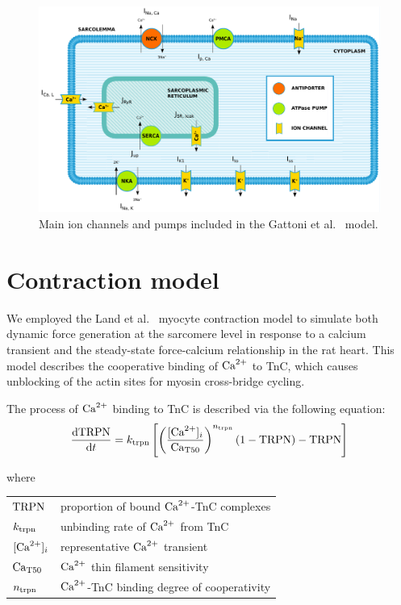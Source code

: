 \begin{figure}[ht!]
    \myfloatalign
    \includegraphics[width=\textwidth]{figures/chapter02/new_ep.pdf}
    \caption{Main ion channels and pumps included in the Gattoni et al.~\cite{Gattoni:2016} model.}
    \label{fig:gattonicurrentsfig}
\end{figure}


%
%
%
\section{Contraction model}\label{sec:ch2contractionmodel}
We employed the Land et al.~\cite{Land:2012} myocyte contraction model to simulate both dynamic force generation at the sarcomere level in response to a calcium transient and the steady-state force-calcium relationship in the rat heart. This model describes the cooperative binding of $\textrm{Ca}^{2+}$ to TnC, which causes unblocking of the actin sites for myosin cross-bridge cycling.

\vspace{0.2cm}
The process of $\textrm{Ca}^{2+}$ binding to TnC is described via the following equation:
%
\begin{equation}\label{eq:landodesys1}
    \dfrac{\mathrm{d}{\textrm{TRPN}}}{\mathrm{d}{t}} = k_{\textrm{trpn}}\left[\left(\frac{[\textrm{Ca}^{2+}]_{i}}{\textrm{Ca}_{\textrm{T}50}}\right)^{n_{\textrm{trpn}}}(1-\textrm{TRPN})-\textrm{TRPN}\right]
\end{equation}

\noindent
where

\vspace{0.2cm}
\begin{tabular}{ll}
    $\textrm{TRPN}$  & proportion of bound $\textrm{Ca}^{2+}$-TnC complexes \\
    $k_{\textrm{trpn}}$ & unbinding rate of $\textrm{Ca}^{2+}$ from TnC \\
    $[\textrm{Ca}^{2+}]_{i}$   & representative $\textrm{Ca}^{2+}$ transient \\
    $\textrm{Ca}_{\textrm{T}50}$ & $\textrm{Ca}^{2+}$ thin filament sensitivity \\
    $n_{\textrm{trpn}}$ & $\textrm{Ca}^{2+}$-TnC binding degree of cooperativity
\end{tabular}

